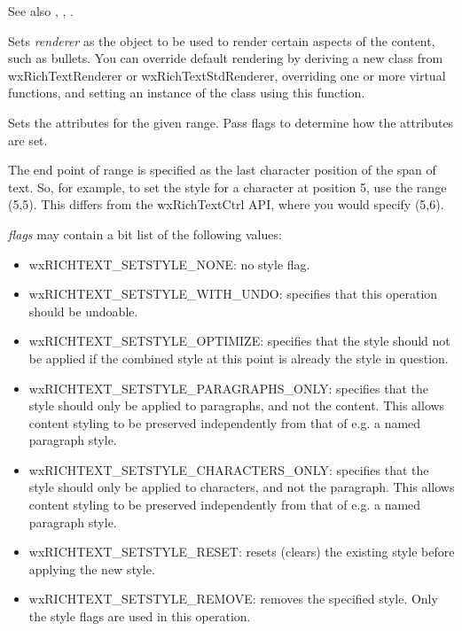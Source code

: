 See also , , .

\label{wxrichtextbuffersetrenderer}


Sets {\it renderer} as the object to be used to render certain aspects of the content, such as bullets.
You can override default rendering by deriving a new class from wxRichTextRenderer or wxRichTextStdRenderer,
overriding one or more virtual functions, and setting an instance of the class using this function.

\label{wxrichtextbuffersetstyle}



Sets the attributes for the given range. Pass flags to determine how the attributes are set.

The end point of range is specified as the last character position of the span of text.
So, for example, to set the style for a character at position 5, use the range (5,5).
This differs from the wxRichTextCtrl API, where you would specify (5,6).

{\it flags} may contain a bit list of the following values:

\begin{itemize}\itemsep=0pt
\item wxRICHTEXT\_SETSTYLE\_NONE: no style flag.
\item wxRICHTEXT\_SETSTYLE\_WITH\_UNDO: specifies that this operation should be undoable.
\item wxRICHTEXT\_SETSTYLE\_OPTIMIZE: specifies that the style should not be applied if the
combined style at this point is already the style in question.
\item wxRICHTEXT\_SETSTYLE\_PARAGRAPHS\_ONLY: specifies that the style should only be applied to paragraphs,
and not the content. This allows content styling to be preserved independently from that of e.g. a named paragraph style.
\item wxRICHTEXT\_SETSTYLE\_CHARACTERS\_ONLY: specifies that the style should only be applied to characters,
and not the paragraph. This allows content styling to be preserved independently from that of e.g. a named paragraph style.
\item wxRICHTEXT\_SETSTYLE\_RESET: resets (clears) the existing style before applying the new style.
\item wxRICHTEXT\_SETSTYLE\_REMOVE: removes the specified style. Only the style flags are used in this operation.
\end{itemize}

